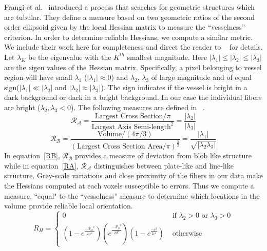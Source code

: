 Frangi et al.~\cite{Frangi1998} introduced a process that searches for geometric structures which are tubular. They define a measure based on two geometric ratios of the second order ellipsoid given by the local Hessian matrix to measure the ``vesselness'' criterion.  In order to determine reliable Hessians, we compute a similar metric. We include their work here for completeness and direct the reader to ~\cite{Frangi1998} for details. Let $\lambda_{K}$ be the eigenvalue with the $K^{th}$ smallest magnitude. Here $|{\lambda}_{1}| \leq| {\lambda}_{2}|\leq| {\lambda}_{3}| $ are the eigen values of the Hessian matrix. Specifically, a  pixel belonging to vessel region will have small $\lambda_{1}$ ($|\lambda_{1}|\approx 0$) and $\lambda_{2}$, $\lambda_{3}$ of large magnitude and of equal sign($|\lambda_{1}| \ll |\lambda_{2}|$ and $|\lambda_{2}|\approx |\lambda_{3}|$). The sign indicates if the vessel is bright in a dark background or dark in a bright background. In our case the individual fibers are bright ($\lambda_2,\lambda_3 < 0$).  The following measures are defined in ~\cite{Frangi1998}.  
\begin{equation}\label{RA}
\mathcal{R_{A}}=\frac{\textrm{Largest  Cross Section}\big/ \pi}{{\textrm{Largest Axis Semi-length}}^{2}}=\frac{|\lambda_{2}|}{|\lambda_{3}|}
\end{equation}
\begin{equation}\label{RB}
\mathcal{R_{B}}=\frac{\textrm{Volume}\big/ (4\pi \big/ 3)}{{(\textrm{Largest Cross Section Area}\big/ \pi)}^{\frac{3}{2}}}=\frac{|\lambda_{1}|}{\sqrt{|\lambda_{2}\lambda_{3}|}}
\end{equation}
In equation~\ref{RB}, $\mathcal{R_{B}}$ provides a measure of deviation from blob like structure while in equation~\ref{RA}, $\mathcal{R_{A}}$ distinguishes between plate-like and line-like structure. Grey-scale variations and close proximity of the fibers in our data make the Hessians computed at each voxels susceptible to errors. Thus we compute a measure, ``equal" to the ``vesselness'' measure to determine which locations in the volume provide reliable local orientation.
$$
R_{H} = \left\{ \begin{array}{ccc}
 0 & \mbox{ if $\lambda_{2}>0$ or $\lambda_{3}>0$} \\
  (1-e^{\frac{\mathcal{-R_{A}}^{2}}{2\alpha^{2}}})
  (e^{\frac{\mathcal{-R_{B}}^{2}}{2\beta^{2}}}) (1-e^{\frac{-s^2}{2c^2}}) &\mbox{ otherwise}
       \end{array} \right.
$$



